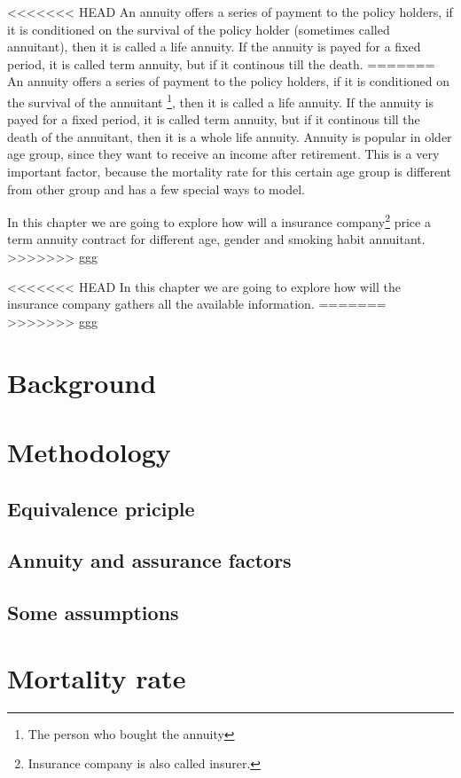 \documentclass{report}
\begin{document}
<<<<<<< HEAD
An annuity offers a series of payment to the policy holders, if it is conditioned on the survival of the policy holder (sometimes called annuitant), then it is called a life annuity. If the annuity is payed for a fixed period, it is called term annuity, but if it continous till the death.
=======
An annuity offers a series of payment to the policy holders, if it is conditioned on the survival of the annuitant \footnote{The person who bought the annuity}, then it is called a life annuity. If the annuity is payed for a fixed period, it is called term annuity, but if it continous till the death of the annuitant, then it is a whole life annuity.
Annuity is popular in older age group, since they want to receive an income after retirement. This is a very important factor, because the mortality rate for this certain age group is different from other group and has a few special ways to model. 

In this chapter we are going to explore how will a insurance company\footnote{Insurance company is also called insurer.} price a term annuity contract for different age, gender and smoking habit annuitant.
>>>>>>> ggg




<<<<<<< HEAD
In this chapter we are going to explore how will the insurance company gathers all the available information.
=======
>>>>>>> ggg

\section{Background}

\section{Methodology}

\subsection{Equivalence priciple}
\subsection{Annuity and assurance factors}
\subsection{Some assumptions}

\section{Mortality rate}
\end{document}
